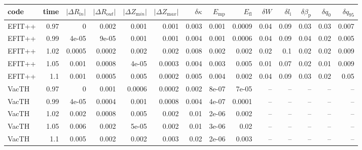 \begin{table}
\centering
\small
\begin{tabular}{lrrrrrrrrrrrrr}
\toprule
   code &  time &  $\left| \Delta R_{\mathrm in} \right|$ &  $\left| \Delta R_{\mathrm out} \right|$ &  $\left| \Delta Z_{\mathrm min} \right|$ &  $\left| \Delta Z_{\mathrm max} \right|$ &  $\delta \kappa$ &  $E_\mathrm{mp}$ &  $E_\mathrm{fl}$ &  $\delta W$ &  $\delta l_{\mathrm i}$ &  $\delta \beta_{\mathrm p}$ &  $\delta q_0$ &  $\delta q_{95}$ \\
\midrule
 EFIT++ &  0.97 &              0 &            0.002 &        0.001 &        0.001 &                  0.003 &       0.001 &      0.0009 &          0.04 &           0.09 &              0.03 &           0.03 &           0.007 \\
 EFIT++ &  0.99 &          4e-05 &            9e-05 &        0.001 &        0.001 &                  0.004 &       0.001 &      0.0006 &          0.04 &           0.09 &              0.04 &           0.02 &           0.005 \\
 EFIT++ &  1.02 &         0.0005 &           0.0002 &        0.002 &        0.002 &                  0.008 &       0.002 &       0.002 &          0.02 &            0.1 &              0.02 &           0.02 &           0.009 \\
 EFIT++ &  1.05 &          0.001 &           0.0008 &        4e-05 &       0.0003 &                  0.004 &       0.003 &       0.005 &          0.01 &           0.07 &              0.02 &           0.01 &           0.009 \\
 EFIT++ &   1.1 &          0.001 &           0.0005 &        0.005 &       0.0002 &                  0.005 &       0.004 &       0.002 &          0.04 &           0.09 &              0.03 &           0.02 &            0.05 \\
  VacTH &  0.97 &              0 &            0.001 &       0.0006 &       0.0002 &                  0.002 &       8e-07 &       7e-05 &           -- &            -- &               -- &            -- &             -- \\
  VacTH &  0.99 &          4e-05 &           0.0004 &        0.001 &       0.0008 &                  0.004 &       4e-07 &      0.0001 &           -- &            -- &               -- &            -- &             -- \\
  VacTH &  1.02 &          0.002 &           0.0008 &        0.005 &        0.002 &                   0.01 &       2e-06 &       0.002 &           -- &            -- &               -- &            -- &             -- \\
  VacTH &  1.05 &          0.006 &            0.002 &        5e-05 &        0.002 &                   0.01 &       3e-06 &        0.02 &           -- &            -- &               -- &            -- &             -- \\
  VacTH &   1.1 &          0.005 &            0.002 &        0.002 &        0.003 &                   0.02 &       2e-06 &       0.003 &           -- &            -- &               -- &            -- &             -- \\
\bottomrule
\end{tabular}


\end{table}
